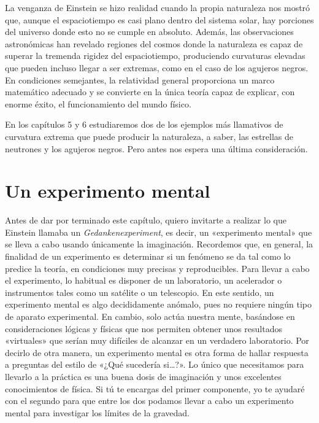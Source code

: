 La venganza de Einstein se hizo realidad cuando la propia naturaleza nos mostró
que, aunque el espaciotiempo es casi plano dentro del sistema solar, hay porciones
del universo donde esto no se cumple en absoluto. Además, las observaciones
astronómicas han revelado regiones del cosmos donde la naturaleza es capaz de
superar la tremenda rigidez del espaciotiempo, produciendo curvaturas elevadas que
pueden incluso llegar a ser extremas, como en el caso de los agujeros negros. En
condiciones semejantes, la relatividad general proporciona un marco matemático
adecuado y se convierte en la única teoría capaz de explicar, con enorme éxito,
el funcionamiento del mundo físico.

En los capítulos 5 y 6 estudiaremos dos de los ejemplos más llamativos de curvatura
extrema que puede producir la naturaleza, a saber, las estrellas de neutrones y
los agujeros negros. Pero antes nos espera una última consideración.

\section{Un experimento mental}\label{sec:04-experiment}

Antes de dar por terminado este capítulo, quiero invitarte a realizar lo que
Einstein llamaba un \emph{Gedankenexperiment}, es decir, un «experimento mental» que
se lleva a cabo usando únicamente la imaginación. Recordemos que, en general, la
finalidad de un experimento es determinar si un fenómeno se da tal como lo predice
la teoría, en condiciones muy precisas y reproducibles. Para llevar a cabo el
experimento, lo habitual es disponer de un laboratorio, un acelerador o
instrumentos tales como un satélite o un telescopio. En este sentido, un
experimento mental es algo decididamente anómalo, pues no requiere ningún tipo de
aparato experimental. En cambio, solo actúa nuestra mente, basándose en
consideraciones lógicas y físicas que nos permiten obtener unos resultados
«virtuales» que serían muy difíciles de alcanzar en un verdadero laboratorio. Por
decirlo de otra manera, un experimento mental es otra forma de hallar respuesta a
preguntas del estilo de «¿Qué sucedería si…?». Lo único que necesitamos para
llevarlo a la práctica es una buena dosis de imaginación y unos excelentes
conocimientos de física. Si tú te encargas del primer componente, yo te ayudaré
con el segundo para que entre los dos podamos llevar a cabo un experimento mental
para investigar los límites de la gravedad.

